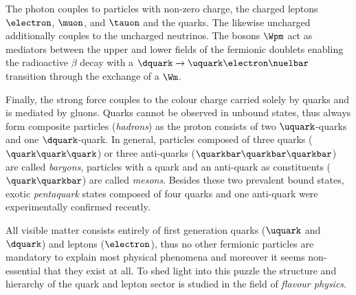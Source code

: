 The photon couples to particles with non-zero \EM charge, \ie the charged
leptons $\electron$, $\muon$, and $\tauon$ and the quarks. The likewise
uncharged \Zboson additionally couples to the uncharged neutrinos. The bosons
$\Wpm$ act as mediators between the upper and lower fields of the fermionic
doublets enabling \eg the radioactive $\beta$ decay with a
$\dquark\to\uquark\electron\nuelbar$ transition through the exchange of a $\Wm$.

Finally, the strong force couples to the colour charge carried solely by quarks
and is mediated by gluons. Quarks cannot be observed in unbound states, thus
always form composite particles (\emph{hadrons}) as \eg the proton consists of
two $\uquark$-quarks and one $\dquark$-quark. In general, particles composed of
three quarks ($\quark\quark\quark$) or three anti-quarks
($\quarkbar\quarkbar\quarkbar$) are called \emph{baryons}, particles with a
quark and an anti-quark as constituents ($\quark\quarkbar$) are called
\emph{mesons}. Besides these two prevalent bound states, exotic
\emph{pentaquark} states composed of four quarks and one anti-quark were
experimentally confirmed \cite{Aaij:2015tga} recently.

All visible matter consists entirely of first generation quarks ($\uquark$ and
$\dquark$) and leptons ($\electron$), thus no other fermionic particles are
mandatory to explain most physical phenomena and moreover it seems non-essential
that they exist at all. To shed light into this puzzle the structure and
hierarchy of the quark and lepton sector is studied in the field of
\emph{flavour physics}.
